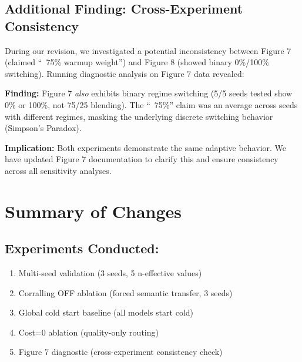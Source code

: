 
\subsection*{Additional Finding: Cross-Experiment Consistency}

During our revision, we investigated a potential inconsistency between Figure 7 (claimed ``~75\% warmup weight'') and Figure 8 (showed binary 0\%/100\% switching). Running diagnostic analysis on Figure 7 data revealed:

\textbf{Finding:} Figure 7 \textit{also} exhibits binary regime switching (5/5 seeds tested show 0\% or 100\%, not 75/25 blending). The ``~75\%'' claim was an average across seeds with different regimes, masking the underlying discrete switching behavior (Simpson's Paradox).

\textbf{Implication:} Both experiments demonstrate the same adaptive behavior. We have updated Figure 7 documentation to clarify this and ensure consistency across all sensitivity analyses.


\section*{Summary of Changes}

\subsection*{Experiments Conducted:}
\begin{enumerate}[leftmargin=*, itemsep=2pt]
    \item Multi-seed validation (3 seeds, 5 n-effective values)
    \item Corralling OFF ablation (forced semantic transfer, 3 seeds)
    \item Global cold start baseline (all models start cold)
    \item Cost=0 ablation (quality-only routing)
    \item Figure 7 diagnostic (cross-experiment consistency check)
\end{enumerate}

